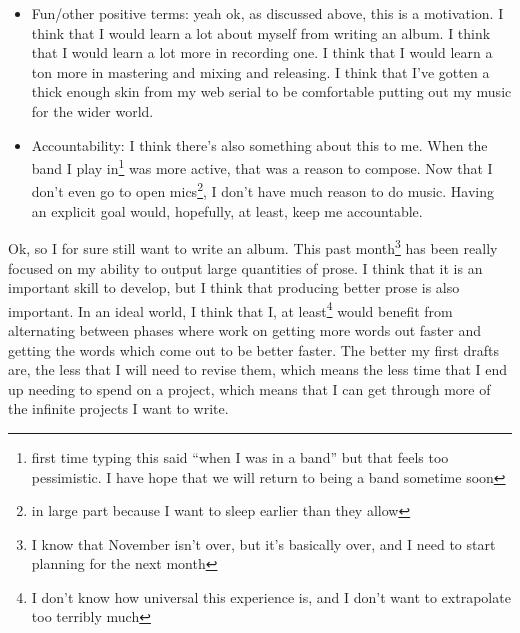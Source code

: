 \documentclass[12pt]{article}[titlepage]
\newcommand{\say}[1]{``#1''}
\newcommand{\1}{\={a}}
\newcommand{\2}{\={e}}
\newcommand{\3}{\={\i}}
\newcommand{\4}{\=o}
\newcommand{\5}{\=u}
\newcommand{\6}{\={A}}
\renewcommand{\,}{\textsuperscript{,}}
\begin{document}
\begin{itemize}
I do love type two fun in retrospect.\footnote{I've seen references to fun as either type one, which is fun because you're doing it, and type two, which is fun because you have done it. I know I've mused about that before. Also, type two fun is explicitly supposed to be fun primarily in retrospect}
That's at least one reason to record an album, I suppose.
It would be cool to be able to point to it as something that I've written and composed, if only because it's a cool flex.
\item Fun/other positive terms: yeah ok, as discussed above, this is a motivation.
I think that I would learn a lot about myself from writing an album.
I think that I would learn a lot more in recording one.
I think that I would learn a ton more in mastering and mixing and releasing.
I think that I've gotten a thick enough skin from my web serial to be comfortable putting out my music for the wider world.
\item Accountability: I think there's also something about this to me.
When the band I play in\footnote{first time typing this said \say{when I was in a band} but that feels too pessimistic. I have hope that we will return to being a band sometime soon} was more active, that was a reason to compose.
Now that I don't even go to open mics\footnote{in large part because I want to sleep earlier than they allow}, I don't have much reason to do music.
Having an explicit goal would, hopefully, at least, keep me accountable.
\end{itemize}

Ok, so I for sure still want to write an album.
This past month\footnote{I know that November isn't over, but it's basically over, and I need to start planning for the next month} has been really focused on my ability to output large quantities of prose.
I think that it is an important skill to develop, but I think that producing better prose is also important.
In an ideal world, I think that I, at least\footnote{I don't know how universal this experience is, and I don't want to extrapolate too terribly much} would benefit from alternating between phases where work on getting more words out faster and getting the words which come out to be better faster.
The better my first drafts are, the less that I will need to revise them, which means the less time that I end up needing to spend on a project, which means that I can get through more of the infinite projects I want to write.
\end{document}
